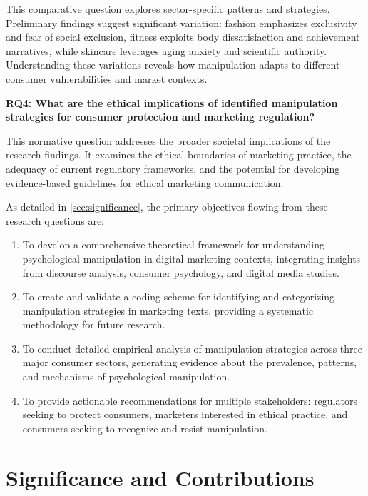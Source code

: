 This comparative question explores sector-specific patterns and strategies. Preliminary findings suggest significant variation: fashion emphasizes exclusivity and fear of social exclusion, fitness exploits body dissatisfaction and achievement narratives, while skincare leverages aging anxiety and scientific authority. Understanding these variations reveals how manipulation adapts to different consumer vulnerabilities and market contexts.

\textbf{RQ4: What are the ethical implications of identified manipulation strategies for consumer protection and marketing regulation?}

This normative question addresses the broader societal implications of the research findings. It examines the ethical boundaries of marketing practice, the adequacy of current regulatory frameworks, and the potential for developing evidence-based guidelines for ethical marketing communication.

As detailed in \autoref{sec:significance}, the primary objectives flowing from these research questions are:

\begin{enumerate}
\item To develop a comprehensive theoretical framework for understanding psychological manipulation in digital marketing contexts, integrating insights from discourse analysis, consumer psychology, and digital media studies.

\item To create and validate a coding scheme for identifying and categorizing manipulation strategies in marketing texts, providing a systematic methodology for future research.

\item To conduct detailed empirical analysis of manipulation strategies across three major consumer sectors, generating evidence about the prevalence, patterns, and mechanisms of psychological manipulation.

\item To provide actionable recommendations for multiple stakeholders: regulators seeking to protect consumers, marketers interested in ethical practice, and consumers seeking to recognize and resist manipulation.
\end{enumerate}

\section{Significance and Contributions}
\label{sec:significance}

